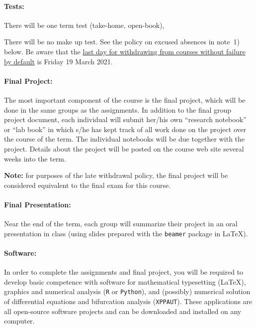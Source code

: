 \documentclass[12pt]{article}
\begin{document}
\paragraph*{Tests:}

There will be one term test (take-home, open-book),

There will be no make up test. See the policy on excused absences in
note~1) below.  Be aware that the
\href{https://academiccalendars.romcmaster.ca/content.php?catoid=41&navoid=8636}{
last day for withdrawing from courses without failure by default} is
Friday 19 March 2021.

\paragraph*{Final Project:}

The most important component of the course is the final project, which
will be done in the same groups as the assignments.  In addition to
the final group project document, each individual will submit her/his
own ``research notebook'' or ``lab book'' in which s/he has kept track
of all work done on the project over the course of the term.  The
individual notebooks will be due together with the project.  Details
about the project will be posted on the course web site several weeks
into the term.

\textbf{Note:} for purposes of the late withdrawal policy, the final project will be considered equivalent to the final exam for this course.

\paragraph*{Final Presentation:}
Near the end of the term, each group will summarize their project in an oral presentation in class (using slides prepared with the {\tt beamer} package in \LaTeX).

\paragraph*{Software:} In order to complete the assignments and final project, you will be required to develop basic competence with software for mathematical typesetting (\LaTeX), graphics and numerical analysis ({\tt R} or {\tt Python}), and (possibly) numerical solution of differential equations and bifurcation analysis ({\tt XPPAUT}).  These applications are all open-source software projects and can be downloaded and installed on any computer.
\end{document}
